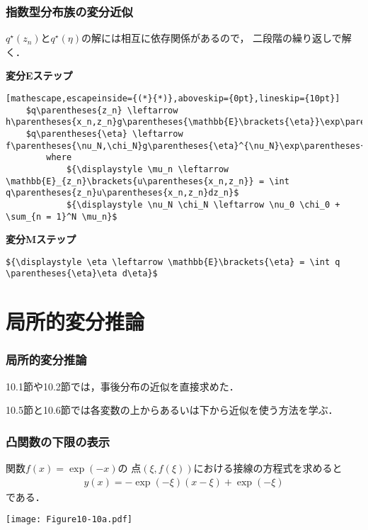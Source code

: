 \documentclass[10pt,hyperref={unicode}]{beamer}
\newcommand{\parentheses}[1]{\left(#1\right)}
\newcommand{\brackets}[1]{\left[#1\right]}
\begin{document}
\begin{frame}[fragile]
\frametitle{指数型分布族の変分近似}
$q^\star\parentheses{z_n}$と$q^\star\parentheses{\eta}$の解には相互に依存関係があるので，
二段階の繰り返しで解く．

\bigskip

\textbf{変分Eステップ}
\begin{lstlisting}[mathescape,escapeinside={(*}{*)},aboveskip={0pt},lineskip={10pt}]
    $q\parentheses{z_n} \leftarrow h\parentheses{x_n,z_n}g\parentheses{\mathbb{E}\brackets{\eta}}\exp\parentheses{\mathbb{E}\brackets{\eta'}u\parentheses{x_n,z_n}}$
    $q\parentheses{\eta} \leftarrow f\parentheses{\nu_N,\chi_N}g\parentheses{\eta}^{\nu_N}\exp\parentheses{\nu_N\eta'\chi_N}$
        where
            ${\displaystyle \mu_n \leftarrow \mathbb{E}_{z_n}\brackets{u\parentheses{x_n,z_n}} = \int q\parentheses{z_n}u\parentheses{x_n,z_n}dz_n}$
            ${\displaystyle \nu_N \chi_N \leftarrow \nu_0 \chi_0 + \sum_{n = 1}^N \mu_n}$
\end{lstlisting}

\smallskip

\textbf{変分Mステップ}
\begin{lstlisting}[mathescape]
    ${\displaystyle \eta \leftarrow \mathbb{E}\brackets{\eta} = \int q \parentheses{\eta}\eta d\eta}$
\end{lstlisting}

\end{frame}

\section{局所的変分推論}
\begin{frame}
\frametitle{局所的変分推論}
10.1節や10.2節では，事後分布の近似を直接求めた．

\bigskip

10.5節と10.6節では各変数の上からあるいは下から近似を使う方法を学ぶ．

\end{frame}

\begin{frame}
\frametitle{凸関数の下限の表示}
関数$f\parentheses{x} = \exp\parentheses{-x}$の
点$\parentheses{\xi,f\parentheses{\xi}}$における接線の方程式を求めると
\begin{align}
    y\parentheses{x} = -\exp\parentheses{-\xi}\parentheses{x - \xi} + \exp\parentheses{-\xi} \tag{10.126}
\end{align}
である．

\smallskip

\begin{center}
    \texttt{[image: Figure10-10a.pdf]}
\end{center}
\end{frame}
\end{document}
